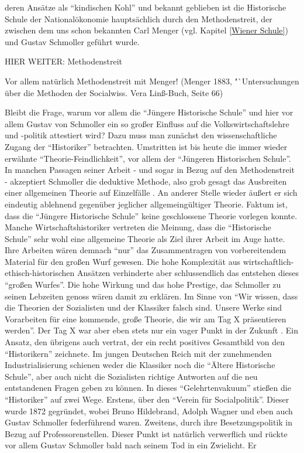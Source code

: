 deren Ansätze als "`kindischen Kohl"' und bekannt geblieben ist die Historische Schule der Nationalökonomie hauptsächlich durch den Methodenstreit, der zwischen dem uns schon bekannten Carl Menger (vgl. Kapitel \ref{Wiener Schule}) und Gustav Schmoller geführt wurde.

HIER WEITER: Methodenstreit

Vor allem natürlich Methodenstreit mit Menger! (Menger 1883, "`Untersuchungen über die Methoden der Socialwiss. Vera Linß-Buch, Seite 66)





Bleibt die Frage, warum vor allem die "`Jüngere Historische Schule"' und hier vor allem Gustav von Schmoller ein so großer Einfluss auf die Volkswirtschaftslehre und -politik attestiert wird? Dazu muss man zunächst den wissenschaftliche Zugang der "`Historiker"' betrachten. Umstritten ist bis heute die immer wieder erwähnte "`Theorie-Feindlichkeit"', vor allem der "`Jüngeren Historischen Schule"'. In manchen Passagen seiner Arbeit - und sogar in Bezug auf den Methodenstreit - akzeptiert Schmoller die deduktive Methode, also grob gesagt das Ausbreiten einer allgemeinen Theorie auf Einzelfälle \parencite[S. 108]{Winkel1989}. An anderer Stelle wieder äußert er sich eindeutig ablehnend gegenüber jeglicher allgemeingültiger Theorie. Faktum ist, dass die "`Jüngere Historische Schule"' keine geschlossene Theorie vorlegen konnte. Manche Wirtschaftshistoriker vertreten die Meinung, dass die "`Historische Schule"' sehr wohl eine allgemeine Theorie als Ziel ihrer Arbeit im Auge hatte. Ihre Arbeiten wären demnach "`nur"' das Zusammentragen von vorbereitendem Material für den großen Wurf gewesen. Die hohe Komplexität aus wirtschaftlich-ethisch-historischen Ansätzen verhinderte aber schlussendlich das entstehen dieses "`großen Wurfes"'. Die hohe Wirkung und das hohe Prestige, das Schmoller zu seinen Lebzeiten genoss wären damit zu erklären. Im Sinne von "`Wir wissen, dass die Theorien der Sozialisten und der Klassiker falsch sind. Unsere Werke sind Vorarbeiten für eine kommende, große Theorie, die wir am Tag X präsentieren werden"'. Der Tag X war aber eben stets nur ein vager Punkt in der Zukunft \parencite[S. 115]{Winkel1989}. Ein Ansatz, den übrigens auch \textcite[S. 775]{Schumpeter1954} vertrat, der ein recht positives Gesamtbild von den "`Historikern"' zeichnete. Im jungen Deutschen Reich mit der zunehmenden Industrialisierung schienen weder die Klassiker noch die "`Ältere Historische Schule"', aber auch nicht die Sozialisten richtige Antworten auf die neu entstandenen Fragen geben zu können. In dieses "`Gelehrtenvakuum"' stießen die "`Historiker"' auf zwei Wege. Erstens, über den "`Verein für Socialpolitik"'. Dieser wurde 1872 gegründet, wobei Bruno Hildebrand, Adolph Wagner und eben auch Gustav Schmoller federführend waren. Zweitens, durch ihre Besetzungspolitik in Bezug auf Professorenstellen. Dieser Punkt ist natürlich verwerflich und rückte vor allem Gustav Schmoller bald nach seinem Tod in ein Zwielicht. Er 

